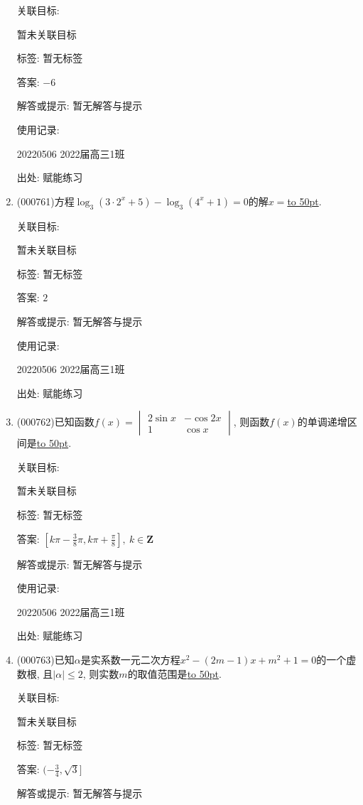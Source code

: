 \documentclass[10pt,a4paper]{article}
\newcommand{\blank}[1]{\underline{\hbox to #1pt{}}}
\begin{document}
\begin{enumerate}[1.]
关联目标:

暂未关联目标



标签: 暂无标签

答案: $-6$

解答或提示: 暂无解答与提示

使用记录:

20220506	2022届高三1班	


出处: 赋能练习
\item { (000761)}方程$\log_3(3 \cdot 2^x+5)-\log_3(4^x+1)=0$的解$x=$\blank{50}.


关联目标:

暂未关联目标



标签: 暂无标签

答案: $2$

解答或提示: 暂无解答与提示

使用记录:

20220506	2022届高三1班	


出处: 赋能练习
\item { (000762)}已知函数$f(x)=\begin{vmatrix}
2\sin x & -\cos 2x  \\ 1  & \cos x  \end{vmatrix}$, 则函数$f(x)$的单调递增区间是\blank{50}.


关联目标:

暂未关联目标



标签: 暂无标签

答案: $[k\pi -\frac 38\pi ,k\pi +\frac{\pi}8], \ k\in \mathbf{Z}$

解答或提示: 暂无解答与提示

使用记录:

20220506	2022届高三1班	


出处: 赋能练习
\item { (000763)}已知$\alpha$是实系数一元二次方程$x^2-(2m-1)x+m^2+1=0$的一个虚数根, 且$|\alpha|\le 2$, 则实数$m$的取值范围是\blank{50}.


关联目标:

暂未关联目标



标签: 暂无标签

答案: $(-\frac 34,\sqrt 3]$

解答或提示: 暂无解答与提示


\end{enumerate}
\end{document}
